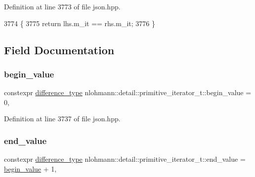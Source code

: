 Definition at line 3773 of file json.\+hpp.


\begin{DoxyCode}
3774     \{
3775         \textcolor{keywordflow}{return} lhs.m\_it == rhs.m\_it;
3776     \}
\end{DoxyCode}


\subsection{Field Documentation}
\mbox{\label{classnlohmann_1_1detail_1_1primitive__iterator__t_afcb3bcf9da8aa95bd82067d1a67c2326}} 
\subsubsection{\texorpdfstring{begin\+\_\+value}{begin\_value}}
{\footnotesize\ttfamily constexpr \hyperlink{classnlohmann_1_1detail_1_1primitive__iterator__t_af3db0d5c90de427d51645fe73a015553}{difference\+\_\+type} nlohmann\+::detail\+::primitive\+\_\+iterator\+\_\+t\+::begin\+\_\+value = 0\hspace{0.3cm}{\ttfamily [static]}, {\ttfamily [private]}}



Definition at line 3737 of file json.\+hpp.

\mbox{\label{classnlohmann_1_1detail_1_1primitive__iterator__t_aa37c37da44f19e6ec1d7d4a9910511c7}} 
\subsubsection{\texorpdfstring{end\+\_\+value}{end\_value}}
{\footnotesize\ttfamily constexpr \hyperlink{classnlohmann_1_1detail_1_1primitive__iterator__t_af3db0d5c90de427d51645fe73a015553}{difference\+\_\+type} nlohmann\+::detail\+::primitive\+\_\+iterator\+\_\+t\+::end\+\_\+value = \hyperlink{classnlohmann_1_1detail_1_1primitive__iterator__t_afcb3bcf9da8aa95bd82067d1a67c2326}{begin\+\_\+value} + 1\hspace{0.3cm}{\ttfamily [static]}, {\ttfamily [private]}}



